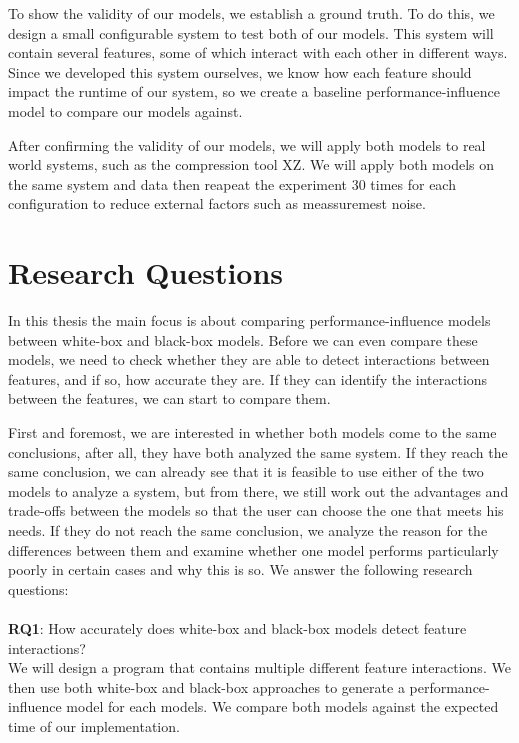 To show the validity of our models, we establish a ground truth. To do this, we design a small configurable system to test both of our 
models. This system will contain several features, some of which interact with each other in different ways. 
Since we developed this system ourselves, we know how each feature should impact the runtime of our system, so we create
a baseline performance-influence model to compare our models against.

After confirming the validity of our models, we will apply both models to real world systems, such as the compression tool
XZ. We will apply both models on the same system and data then reapeat the experiment 30 times for each configuration to reduce external
factors such as meassuremest noise.

\section{Research Questions}
In this thesis the main focus is about comparing performance-influence models between white-box and black-box models. 
Before we can even compare these models, we need to check whether they are able to detect interactions between features, 
and if so, how accurate they are. If they can identify the interactions between the features, we can start to compare them. 

First and foremost, we are interested in whether both models come to the same conclusions, after all, they have both analyzed the same system. 
If they reach the same conclusion, we can already see that it is feasible to use either of the two models to analyze a system, 
but from there, we still work out the advantages and trade-offs between the models so that the user can choose the one that meets 
his needs. If they do not reach the same conclusion, we analyze the reason for the differences between them and examine whether one model 
performs particularly poorly in certain cases and why this is so. We answer the following research questions:\\\\

\noindent \textbf{RQ1}: How accurately does white-box and black-box models detect feature interactions? \\

\noindent We will design a program that contains multiple different feature interactions. We then use both white-box and black-box approaches to generate a
 performance-influence model for each models. We compare both models against the expected time of our implementation. \\

